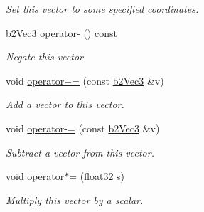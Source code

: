 \begin{DoxyCompactItemize}
\begin{DoxyCompactList}\small\item\em Set this vector to some specified coordinates. \end{DoxyCompactList}\item 
\hyperlink{structb2_vec3}{b2\+Vec3} \hyperlink{structb2_vec3_a246cb7ed59d3e758989939ed4e30e5ec}{operator-\/} () const \hypertarget{structb2_vec3_a246cb7ed59d3e758989939ed4e30e5ec}{}\label{structb2_vec3_a246cb7ed59d3e758989939ed4e30e5ec}

\begin{DoxyCompactList}\small\item\em Negate this vector. \end{DoxyCompactList}\item 
void \hyperlink{structb2_vec3_a2aaeed3f5308aad85d19c5f0efc72641}{operator+=} (const \hyperlink{structb2_vec3}{b2\+Vec3} \&v)\hypertarget{structb2_vec3_a2aaeed3f5308aad85d19c5f0efc72641}{}\label{structb2_vec3_a2aaeed3f5308aad85d19c5f0efc72641}

\begin{DoxyCompactList}\small\item\em Add a vector to this vector. \end{DoxyCompactList}\item 
void \hyperlink{structb2_vec3_a9e5b535548e1c5dfc0dc258d08f5ca32}{operator-\/=} (const \hyperlink{structb2_vec3}{b2\+Vec3} \&v)\hypertarget{structb2_vec3_a9e5b535548e1c5dfc0dc258d08f5ca32}{}\label{structb2_vec3_a9e5b535548e1c5dfc0dc258d08f5ca32}

\begin{DoxyCompactList}\small\item\em Subtract a vector from this vector. \end{DoxyCompactList}\item 
void \hyperlink{structb2_vec3_aaa9aa20195cd0ee53c7176a9a9b02389}{operator$\ast$=} (float32 s)\hypertarget{structb2_vec3_aaa9aa20195cd0ee53c7176a9a9b02389}{}\label{structb2_vec3_aaa9aa20195cd0ee53c7176a9a9b02389}

\begin{DoxyCompactList}\small\item\em Multiply this vector by a scalar. \end{DoxyCompactList}\end{DoxyCompactItemize}
